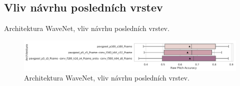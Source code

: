 \subsection{Vliv návrhu posledních vrstev}

\begin{table}[h!]
\centering
\caption{Architektura WaveNet, vliv návrhu posledních vrstev.}\label{tab:wavenet_output_transform}
\end{table}

\begin{figure}[h]\centering
    \includegraphics[scale=0.6]{../img/figures/wavenet_output_transform.pdf}
\caption{Architektura WaveNet, vliv návrhu posledních vrstev.}\label{obr:wavenet_output_transform}
\end{figure}

